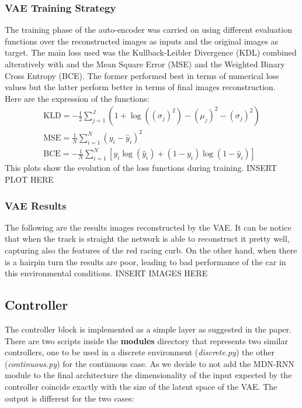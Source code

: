 \documentclass[10pt,a4paper]{article}
\begin{document}
\subsubsection{VAE Training Strategy}
The training phase of the auto-encoder was carried on using different evaluation functions over the reconstructed images as inputs and the original images as target. The main loss used was the Kullback-Leibler Divergence (KDL) combined alteratively  with and the Mean Square Error (MSE) and the Weighted Binary Cross Entropy (BCE). The former performed best in terms of numerical loss values but the latter perform better in terms of final images reconstruction.\\
Here are the expression of the functions:
\begin{gather}
    \text{KLD} = -\frac{1}{2} \sum_{j=1}^J (1 + \log((\sigma_j)^2) - (\mu_j)^2 - (\sigma_j)^2) \\
    \text{MSE} = \frac{1}{N} \sum_{i=1}^N (y_i - \hat{y}_i)^2 \\
    \text{BCE} = -\frac{1}{N} \sum_{i=1}^N [y_i \log(\hat{y}_i) + (1 - y_i) \log(1 - \hat{y}_i)]
\end{gather}
This plots show  the evolution of the loss functions during training.
INSERT PLOT HERE

\subsubsection{VAE Results}
The following are the results images reconstructed by the VAE. It can be notice that when the track is straight the network is able to reconstruct it pretty well, capturing also the features of the red racing curb. On the other hand, when there is a hairpin turn the results are poor, leading to bad performance of the car in this environmental conditions.
INSERT IMAGES HERE

\newpage


\subsection*{Controller}
The controller block is implemented as a simple  layer as suggested in the paper. There are two scripts inside the \textbf{modules} directory that represents two similar controllers, one to be used in a discrete environment (\textit{discrete.py}) the other (\textit{continuous.py}) for the continuous case. As we decide to not add the MDN-RNN module to the final architecture the dimensionality  of the input expected by the controller coincide exactly with the size of the latent space of the VAE. The output is different for the two cases:\\
\end{document}
